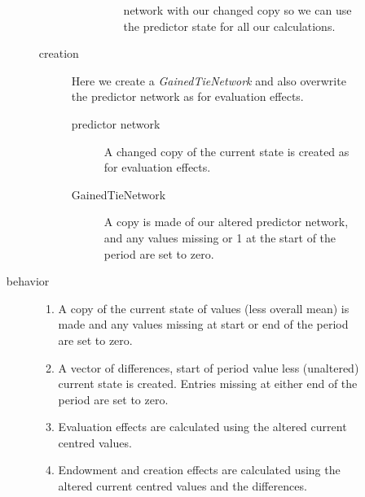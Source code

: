 \documentclass[12pt,a4paper]{article}
\renewcommand{\=}{\,=\,}
\newcommand{\+}{\,+\,}
\newcommand{\nnm}[1]{\textsf{\small\textit{#1}}}
\begin{document}
\begin{description}
\begin{enumerate}
\begin{description}
\begin{description}
\begin{description}
\begin{enumerate}
          network with our changed copy so we can use the predictor state for
          all our calculations.
        \end{enumerate}
      \end{description}
    \item[creation] Here we create a \nnm{GainedTieNetwork} and also overwrite
      the predictor network as for evaluation effects.
      \begin{description}
      \item[predictor network] A changed copy of the current state is created as
        for evaluation effects.
      \item[GainedTieNetwork]
         A copy is made of our altered predictor network, and any values
          missing or 1 at the start of the period are set to zero.
      \end{description}
    \end{description}
  \item[behavior]
    \begin{enumerate}
    \item A copy of the current state of values (less overall mean) is made and
      any values missing at start or end of the period are set to zero.
    \item A vector of differences, start of period value less (unaltered)
      current state is created. Entries missing at either end of the period are
      set to zero.
    \item Evaluation effects are calculated using the altered current centred
      values.
    \item Endowment and creation effects are calculated using the altered
      current centred values and the differences.
    \end{enumerate}
  \end{description}
\end{enumerate}
\end{description}
\end{document}
